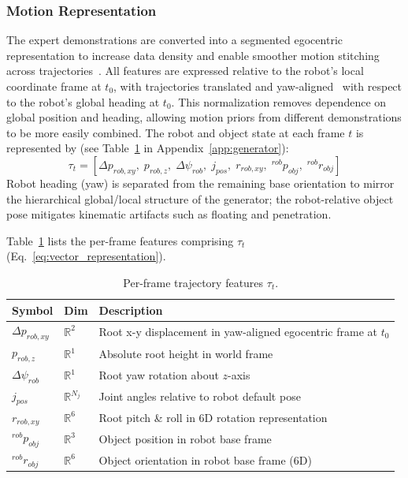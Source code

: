 \documentclass{article}
\begin{document}
\subsubsection{Motion Representation}
\label{app:motion_representation}
The expert demonstrations are converted into a segmented egocentric representation to increase data density and enable smoother motion stitching across trajectories~\cite{shi2024interactivecharactercontrolautoregressive, seo2023deep, Guo_2022_CVPR, tevet2022humanmotiondiffusionmodel}. All features are expressed relative to the robot's local coordinate frame at $t_0$, with trajectories translated and yaw-aligned~\cite{luo2024universalhumanoidmotionrepresentations} with respect to the robot's global heading at $t_0$. This normalization removes dependence on global position and heading, allowing motion priors from different demonstrations to be more easily combined. The robot and object state at each frame $t$ is represented by (see Table~\ref{tab:feat_repr} in Appendix~\ref{app:generator}):
\begin{equation} \label{eq:vector_representation}
    \tau_t = [\Delta p_{rob,xy},\; p_{rob,z},\; \Delta \psi_{rob},\; j_{pos},\; r_{rob,xy},\; {}^{rob} p_{obj},\; {}^{rob} r_{obj}]
\end{equation}
Robot heading (yaw) is separated from the remaining base orientation to mirror the hierarchical global/local structure of the generator; the robot-relative object pose mitigates kinematic artifacts such as floating and penetration.

Table~\ref{tab:feat_repr} lists the per-frame features comprising $\tau_t$ (Eq.~\eqref{eq:vector_representation}).

\begin{table}[h]
\centering\small
\caption{Per-frame trajectory features $\tau_t$.}
\label{tab:feat_repr}
\setlength{\tabcolsep}{4pt}
\begin{tabular}{@{}llp{6cm}@{}}
\toprule
\textbf{Symbol} & \textbf{Dim} & \textbf{Description} \\
\midrule
$\Delta p_{rob,xy}$ & $\mathbb{R}^2$     & Root x-y displacement in yaw-aligned egocentric frame at $t_0$ \\
$p_{rob,z}$         & $\mathbb{R}^1$     & Absolute root height in world frame \\
$\Delta\psi_{rob}$  & $\mathbb{R}^1$     & Root yaw rotation about $z$-axis \\
$j_{pos}$           & $\mathbb{R}^{N_j}$ & Joint angles relative to robot default pose \\
$r_{rob,xy}$        & $\mathbb{R}^6$     & Root pitch \& roll in 6D rotation representation~\cite{zhou2019continuity} \\
${}^{rob}p_{obj}$   & $\mathbb{R}^3$     & Object position in robot base frame \\
${}^{rob}r_{obj}$   & $\mathbb{R}^6$     & Object orientation in robot base frame (6D) \\
\bottomrule
\end{tabular}
\end{table}
\end{document}
